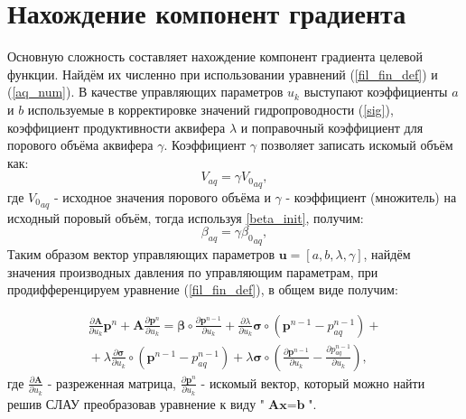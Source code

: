 \documentclass[14pt]{article}
\begin{document}
\section{Нахождение компонент градиента}
Основную сложность составляет нахождение компонент градиента целевой функции. Найдём их численно при использовании уравнений (\ref{fil_fin_def}) и (\ref{aq_num}). В качестве управляющих параметров $ u_k $ выступают коэффициенты $ a $ и $ b $ используемые в корректировке значений гидропроводности   (\ref{sig}), коэффициент продуктивности аквифера $ \lambda $ и поправочный коэффициент для порового объёма аквифера $ \gamma $. Коэффициент $ \gamma $ позволяет записать искомый объём как:
\begin{equation*} \label{gamma_init}
V_{aq} = \gamma{V_0}_{aq},
\end{equation*}
 где $ {V_0}_{aq}$ -  исходное значения порового объёма и $ \gamma $ - коэффициент (множитель) на исходный поровый объём, тогда используя {\ref{beta_init}}, получим:
 \begin{equation} \label{beta_gamma}
 \beta_{aq} = \gamma {\beta_0}_{aq},
 \end{equation}
  Таким образом вектор управляющих параметров $ \boldsymbol{u} = [a,b,\lambda,\gamma]$, найдём значения производных давления по управляющим параметрам, при продифференцируем уравнение (\ref{fil_fin_def}), в общем виде получим:

\begin{multline} \label{dFP_du}
\frac{\partial \boldsymbol{A}}{\partial u_k}\boldsymbol{p}^n + \boldsymbol{A}\frac{\partial \boldsymbol{p}^n}{\partial u_k} =
\boldsymbol{\beta}\circ\frac{\partial \boldsymbol{p}^{n-1}}{\partial u_k} + \frac{\partial \lambda}{\partial u_k}\boldsymbol{\sigma}\circ(\boldsymbol{p}^{n-1}-p_{aq}^{n-1})+ {} \\
{} + 
\lambda\frac{\partial \boldsymbol{\sigma}}{\partial u_k}\circ(\boldsymbol{p}^{n-1}-p_{aq}^{n-1})+
\lambda\boldsymbol{\sigma}\circ\left(\frac{\partial \boldsymbol{p}^{n-1}}{\partial u_k}-\frac{\partial p_{aq}^{n-1}}{\partial u_k}\right),
\end{multline}
где $ \frac{\partial \boldsymbol{A}}{\partial u_k} $ - разреженная матрица, $ \frac{\partial \boldsymbol{p}^n}{\partial u_k} $ - искомый вектор, который можно найти решив СЛАУ преобразовав уравнение к виду "$\textbf{A}\textbf{x}=\textbf{b}$".
\end{document}
